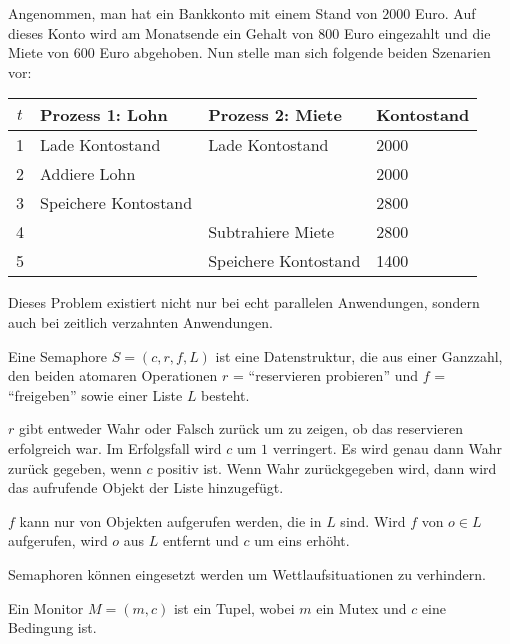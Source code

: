 \begin{beispiel}[Wettlaufsituation]
    Angenommen, man hat ein Bankkonto mit einem Stand von $\num{2000}$ Euro.
    Auf dieses Konto wird am Monatsende ein Gehalt von $\num{800}$ Euro eingezahlt
    und die Miete von $\num{600}$ Euro abgehoben. Nun stelle man sich folgende
    beiden Szenarien vor:

    \begin{table}[h]
        \centering
        \begin{tabular}{c|l|l|l}
        $t$ & Prozess 1: Lohn        & Prozess 2: Miete     & Kontostand \\ \hline
          1 &Lade Kontostand         & Lade Kontostand      & 2000       \\
          2 & Addiere Lohn           & ~                    & 2000       \\
          3 & Speichere Kontostand   & ~                    & 2800       \\
          4 & ~                      & Subtrahiere Miete    & 2800       \\
          5 & ~                      & Speichere Kontostand & 1400       \\
        \end{tabular}
    \end{table}

    Dieses Problem existiert nicht nur bei echt parallelen Anwendungen, sondern
    auch bei zeitlich verzahnten Anwendungen.
\end{beispiel}

\begin{definition}[Semaphore]%
    Eine Semaphore $S=(c, r, f, L)$ ist eine Datenstruktur, die aus einer Ganzzahl, den beiden 
    atomaren Operationen $r$ = \enquote{reservieren probieren} und $f$ = \enquote{freigeben}
    sowie einer Liste $L$ besteht.

    $r$ gibt entweder Wahr oder Falsch zurück um zu zeigen, ob das reservieren
    erfolgreich war. Im Erfolgsfall wird $c$ um $1$ verringert. Es wird genau
    dann Wahr zurück gegeben, wenn $c$ positiv ist. Wenn Wahr zurückgegeben wird,
    dann wird das aufrufende Objekt der Liste hinzugefügt.

    $f$ kann nur von Objekten aufgerufen werden, die in $L$ sind. Wird $f$ von
    $o \in L$ aufgerufen, wird $o$ aus $L$ entfernt und $c$ um eins erhöht.
\end{definition}

Semaphoren können eingesetzt werden um Wettlaufsituationen zu verhindern.

\begin{definition}[Monitor]%
    Ein Monitor $M = (m, c)$ ist ein Tupel, wobei $m$ ein Mutex und $c$ eine 
    Bedingung ist.
\end{definition}

